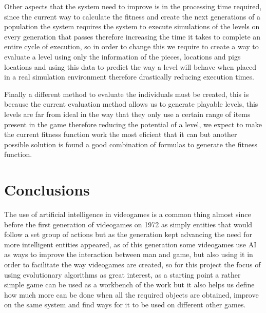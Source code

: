 \documentclass[conference]{IEEEtran}
\begin{document}
Other aspects that the system need to improve is in the processing time required, since the current way to calculate the fitness and create the next generations of a population the system requires the system to execute simulations of the levels on every generation that passes therefore increasing the time it takes to complete an entire cycle of execution, so in order to change this we require to create a way to evaluate a level using only the information of the pieces, locations and pigs locations and using this data to predict the way a level will behave when placed in a real simulation environment therefore drastically reducing execution times.

Finally a different method to evaluate the individuals must be created, this is because the current evaluation method allows us to generate playable levels, this levels are far from ideal in the way that they only use a certain range of items present in the game therefore reducing the potential of a level, we expect to make the current fitness function work the most eficient that it can but another possible solution is found a good combination of formulas to generate the fitness function.

\section{Conclusions}

The use of artificial intelligence in videogames is a common thing almost since before the first generation of videogames on 1972 as simply entities that would follow a set group of actions but as the generation kept advancing the need for more intelligent entities appeared, as of this generation some videogames use AI as ways to improve the interaction between man and game, but also using it in order to facilitate the way videogames are created, so for this project the focus of using evolutionary algorithms as great interest, as a starting point a rather simple game can be used as a workbench of the work but it also helps us define how much more can be done when all the required objects are obtained, improve on the same system and find ways for it to be used on different other games.

\printbibliography
\newrefcontext[sorting=ydnt]
\end{document}
